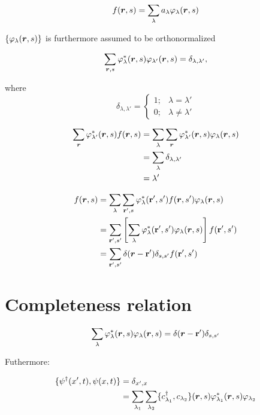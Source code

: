 \begin{equation}
	f(\bm{r},s) = \sum_\lambda a_\lambda \varphi_\lambda (\bm{r}, s)
\end{equation}

$\{ \varphi_\lambda(\bm{r},s) \}$ is furthermore assumed to be orthonormalized

\begin{equation}
	\sum_{\bm{r},s} \varphi_\lambda^* (\bm{r},s) \varphi_{\lambda'} (\bm{r},s) = \delta_{\lambda, \lambda'},
\end{equation}

where 
\[
	\delta_{\lambda, \lambda'}=
\begin{cases}
	1;& \lambda = \lambda'\\
	0; & \lambda \neq \lambda' 
\end{cases}
\]

\begin{align*}
	\sum_{\bm{r}} \varphi_{\lambda'}^*(\bm{r},s) f(\bm{r},s) &= \sum_\lambda \sum_{\bm{r}} \varphi_{\lambda'}^*(\bm{r},s) \varphi_\lambda(\bm{r},s)\\
	&= \sum_\lambda \delta_{\lambda, \lambda'}\\
	&= \lambda'
\end{align*}

\begin{align*}
	f(\bm{r},s) &= \sum_\lambda \sum_{\vb{r'},s} \varphi_\lambda^* (\vb{r'},s') f(\bm{r},s') \varphi_\lambda (\bm{r},s)\\
	&= \sum_{\vb{r'},s'} \left[ \sum_\lambda \varphi_\lambda^* (\vb{r'},s') \varphi_\lambda (\bm{r},s) \right] f(\vb{r'},s') \\
	&= \sum_{\vb{r'},s'} \delta(\bm{r}-\vb{r'}) \delta_{s,s'} f(\vb{r'},s')
\end{align*}
 
\section{Completeness relation}

\begin{equation}
	\sum_\lambda \varphi_\lambda^* (\bm{r},s) \varphi_\lambda(\bm{r},s) = \delta(\bm{r}-\vb{r'}) \delta_{s,s'}
\end{equation}

Futhermore:

\begin{align}
	\{ \psi^\dagger(x',t), \psi(x,t) \} &= \delta_{x',x} \label{complete_1} \\
	&= \sum_{\lambda_1} \sum_{\lambda_2} \{c^{\dagger}_{\lambda_1}, c_{\lambda_2} \} (\bm{r},s)  \varphi_{\lambda_1}^* (\bm{r},s) \varphi_{\lambda_2} \nonumber
\end{align}

